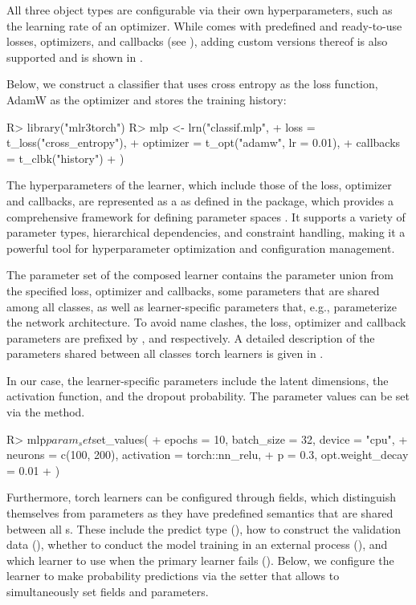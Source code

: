 \documentclass[article]{jss}
\theoremstyle{definition}
\begin{document}
All three object types are configurable via their own hyperparameters, such as the learning rate of an optimizer.
While  comes with predefined and ready-to-use losses, optimizers, and callbacks (see ), adding custom versions thereof is also supported and is shown in .

Below, we construct a  classifier that uses cross entropy as the loss function, AdamW as the optimizer \citep{ref-loshchilov2017decoupled} and stores the training history:

\begin{CodeInput}
R> library("mlr3torch")
R> mlp <- lrn("classif.mlp",
+   loss = t_loss("cross_entropy"),
+   optimizer = t_opt("adamw", lr = 0.01),
+   callbacks = t_clbk("history")
+ )
\end{CodeInput}

The hyperparameters of the learner, which include those of the loss, optimizer and callbacks, are represented as a  as defined in the  package, which provides a comprehensive framework for defining parameter spaces \citep{ref-paradox2024}.
It supports a variety of parameter types, hierarchical dependencies, and constraint handling, making it a powerful tool for hyperparameter optimization and configuration management.

The parameter set of the composed learner contains the parameter union from the specified loss, optimizer and callbacks, some parameters that are shared among all  classes, as well as learner-specific parameters that, e.g., parameterize the network architecture.
To avoid name clashes, the loss, optimizer and callback parameters are prefixed by ,   and  respectively.
A detailed description of the parameters shared between all classes torch learners is given in .

In our case, the learner-specific parameters include the latent dimensions, the activation function, and the dropout probability.
The parameter values can be set via the  method.

\begin{CodeInput}
R> mlp$param_set$set_values(
+   epochs = 10, batch_size = 32, device = "cpu",
+   neurons = c(100, 200), activation = torch::nn_relu,
+   p = 0.3, opt.weight_decay = 0.01
+ )
\end{CodeInput}

Furthermore, torch learners can be configured through fields, which distinguish themselves from parameters as they have predefined semantics that are shared between all s.
These include the predict type (), how to construct the validation data (), whether to conduct the model training in an external process (), and which learner to use when the primary learner fails ().
Below, we configure the learner to make probability predictions via the setter  that allows to simultaneously set fields and parameters.
\end{document}
